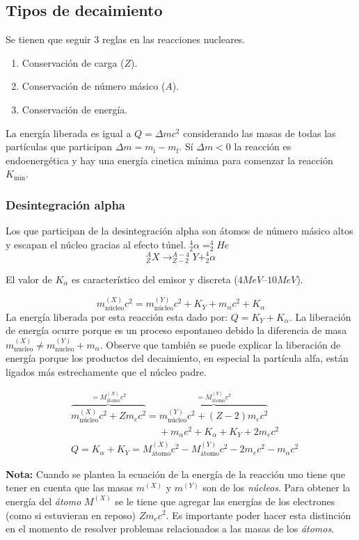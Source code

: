 \documentclass[10pt,twocolumn,titlepage]{article}
\newcommand{\inicial}{\textrm{i}}
\newcommand{\final}{\textrm{f}}
\newcommand{\minima}{\textrm{mín}}
\newcommand{\nucleo}{ {\textrm{núcleo}}}
\newcommand{\atomo}{ {\textrm{átomo}} }
\begin{document}
\subsection{Tipos de decaimiento}
Se tienen que seguir 3 reglas en las reacciones nucleares.
\begin{enumerate}
\item Conservación de carga ($Z$).
\item Conservación de número másico ($A$).
\item Conservación de energía.
\end{enumerate}
La energía liberada es igual a $Q=\Delta mc^2$ considerando las masas de todas las partículas que participan $\Delta m =m_{\inicial}-m_{\final}$. Sí $\Delta m<0$ la reacción es endoenergética y hay una energía cinetica mínima para comenzar la reacción $K_{\minima}$.
\subsubsection*{Desintegración alpha}
Los que participan de la desintegración alpha son átomos de número másico altos y escapan el núcleo gracias al efecto túnel.
$^4_2\alpha=^4_2He$
$$^A_ZX\rightarrow ^{A-4}_{Z-2}Y+^4_2\alpha  $$

El valor de $K_\alpha$ es característico del emisor y discreta ($4\si{MeV}$--$10\si{MeV}$).

$$m^{(X)}_{\nucleo }c^2 =m^{(Y)}_{\nucleo }c^2+K_Y+m_\alpha c^2+K_\alpha$$
La energía liberada por esta reacción esta dado por: $Q=K_Y+K_\alpha$. La liberación de energía ocurre porque es un proceso espontaneo debido la diferencia de masa $m^{(X)}_{\textrm{nucleo} }\neq m^{(Y)}_{\textrm{nucleo} }+m_\alpha$. Observe que también se puede explicar la liberación de energía porque los productos del decaimiento, en especial la partícula alfa, están ligados más estrechamente que el núcleo padre.


\begin{align*}
&\overbrace{m^{(X)}_\nucleo c^2 +Zm_ec^2}^{=M^{(X)}_\atomo c^2 }=\overbrace{m^{(Y)}_\nucleo c^2+(Z-2)m_ec^2}^{=M^{(Y)}_\atomo c^2}  \\
&\qquad\qquad\qquad\qquad\quad +m_\alpha c^2+ K_\alpha +K_Y +2m_ec^2\\
&Q=K_\alpha+K_Y=M^{(X)}_\atomo c^2-M^{(Y)}_\atomo c^2-2m_ec^2-m_\alpha c^2
\end{align*}

\textbf{Nota:} Cuando se plantea la ecuación de la energía de la reacción uno tiene que tener en cuenta que las masas $m^{(X)}$ y $m^{(Y)}$ son de los \emph{núcleos}. Para obtener la energía del \emph{átomo} $M^{(X)}$ se le tiene que agregar las energías de los electrones (como si estuvieran en reposo) $Zm_ec^2$. Es importante poder hacer esta distinción en el momento de resolver problemas relacionados a las masas de los \emph{átomos}.
\end{document}
